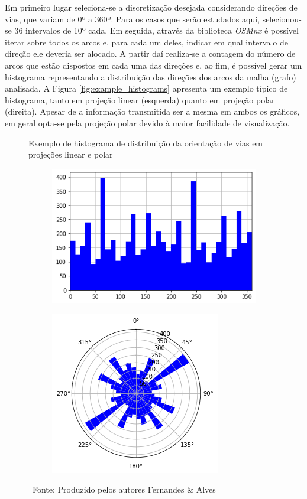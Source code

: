 Em primeiro lugar seleciona-se a discretização desejada considerando direções de vias, que variam de 0º a 360º. 
%
Para os casos que serão estudados aqui, selecionou-se 36 intervalos de 10º cada.
%
Em seguida, através da biblioteca \textit{OSMnx} é possível iterar sobre todos os arcos e, para cada um deles, indicar em qual intervalo de direção ele deveria ser alocado.
%
A partir daí realiza-se a contagem do número de arcos que estão dispostos em cada uma das direções e, ao fim, é possível gerar um histograma representando a distribuição das direções dos arcos da malha (grafo) analisada.
%
A Figura \ref{fig:example_histograms} apresenta um exemplo típico de histograma, tanto em projeção linear (esquerda) quanto em projeção polar (direita). 
Apesar de a informação transmitida ser a mesma em ambos os gráficos, em geral opta-se pela projeção polar devido à maior facilidade de visualização.

\begin{figure}[htbp]
    \centering
    \caption{Exemplo de histograma de distribuição da orientação de vias em projeções linear e polar}
    \label{fig:example_histograms}
    \begin{subfigure}{.49\textwidth}
        \raggedleft
        \includegraphics[height=0.55\textwidth]{images/5_emp_bebidas/street_network_analysis/histogram_cumbica.png}
    \end{subfigure}
    \begin{subfigure}{.49\textwidth}
      \raggedright
      \includegraphics[height=0.55\textwidth]{images/5_emp_bebidas/street_network_analysis/polar_plot_cumbica.png}
    \end{subfigure}
    \caption*{\ Fonte: Produzido pelos autores Fernandes \& Alves}
\end{figure}

